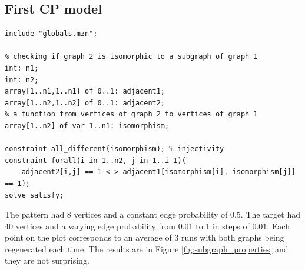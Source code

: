 \documentclass{article}
\theoremstyle{definition}
\begin{document}
\subsection{First CP model}
\begin{lstlisting}
include "globals.mzn";

% checking if graph 2 is isomorphic to a subgraph of graph 1
int: n1;
int: n2;
array[1..n1,1..n1] of 0..1: adjacent1;
array[1..n2,1..n2] of 0..1: adjacent2;
% a function from vertices of graph 2 to vertices of graph 1
array[1..n2] of var 1..n1: isomorphism;

constraint all_different(isomorphism); % injectivity
constraint forall(i in 1..n2, j in 1..i-1)(
    adjacent2[i,j] == 1 <-> adjacent1[isomorphism[i], isomorphism[j]] == 1);
solve satisfy;
\end{lstlisting}
The pattern had 8 vertices and a constant edge probability of 0.5. The target had 40 vertices and a varying edge probability from 0.01 to 1 in steps of 0.01. Each point on the plot corresponds to an average of 3 runs with both graphs being regenerated each time. The results are in Figure \ref{fig:subgraph_properties} and they are not surprising.
\end{document}
